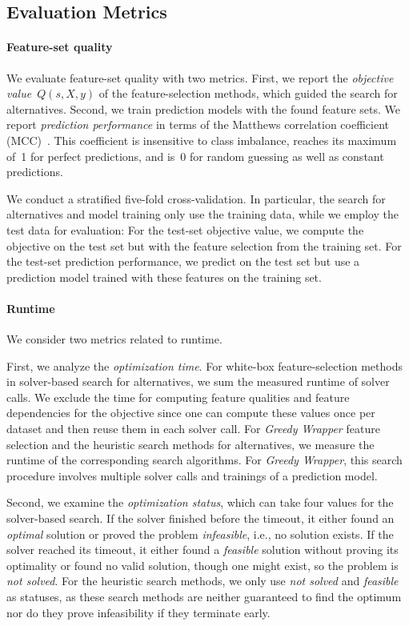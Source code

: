 \documentclass{article}
\theoremstyle{definition}
\begin{document}
\subsection{Evaluation Metrics}
\label{sec:afs:experimental-design:evaluation}

\paragraph{Feature-set quality}

We evaluate feature-set quality with two metrics.
First, we report the \emph{objective value}~$Q(s,X,y)$ of the feature-selection methods, which guided the search for alternatives.
Second, we train prediction models with the found feature sets.
We report \emph{prediction performance} in terms of the Matthews correlation coefficient (MCC)~\cite{matthews1975comparison}.
This coefficient is insensitive to class imbalance, reaches its maximum of~1 for perfect predictions, and is~0 for random guessing as well as constant predictions.

We conduct a stratified five-fold cross-validation.
In particular, the search for alternatives and model training only use the training data, while we employ the test data for evaluation:
For the test-set objective value, we compute the objective on the test set but with the feature selection from the training set.
For the test-set prediction performance, we predict on the test set but use a prediction model trained with these features on the training set.

\paragraph{Runtime}

We consider two metrics related to runtime.

First, we analyze the \emph{optimization time}.
For white-box feature-selection methods in solver-based search for alternatives, we sum the measured runtime of solver calls.
We exclude the time for computing feature qualities and feature dependencies for the objective since one can compute these values once per dataset and then reuse them in each solver call.
For \emph{Greedy Wrapper} feature selection and the heuristic search methods for alternatives, we measure the runtime of the corresponding search algorithms.
For \emph{Greedy Wrapper}, this search procedure involves multiple solver calls and trainings of a prediction model.

Second, we examine the \emph{optimization status}, which can take four values for the solver-based search.
If the solver finished before the timeout, it either found an \emph{optimal} solution or proved the problem \emph{infeasible}, i.e., no solution exists.
If the solver reached its timeout, it either found a \emph{feasible} solution without proving its optimality or found no valid solution, though one might exist, so the problem is \emph{not solved}.
For the heuristic search methods, we only use \emph{not solved} and \emph{feasible} as statuses, as these search methods are neither guaranteed to find the optimum nor do they prove infeasibility if they terminate early.
\end{document}
